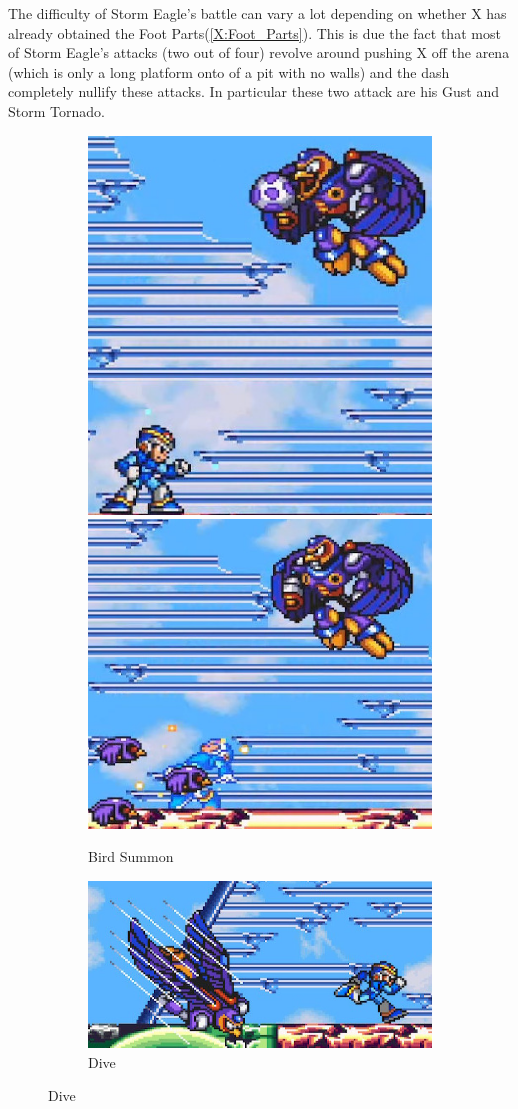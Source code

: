  The difficulty of Storm Eagle's battle can vary a lot depending on whether X has already obtained the Foot Parts(\ref{X:Foot_Parts}). This is due the fact that most of Storm Eagle's attacks (two out of four) revolve around pushing X off the arena (which is only a long platform onto of a pit with no walls) and the dash completely nullify these attacks. In particular these two attack are his Gust\cite{wiki:Storm_Eagle} and Storm Tornado.
 \begin{figure}[htp]
 	\centering
 	\begin{subfigure}{\linewidth}
 		\centering
 		\includegraphics[width=0.25\linewidth]{figures/X1/Storm_eagle/Eagle_egg_1.jpg}
 		\includegraphics[width=0.3\linewidth]{figures/X1/Storm_eagle/Eagle_egg_2.jpg}
 		\caption{Bird Summon}
 	\end{subfigure}
	\begin{subfigure}{0.35\linewidth}
	 	\centering
	 	\includegraphics[width=\linewidth]{figures/X1/Storm_eagle/Eagle_dive.jpg}
	 	\caption{Dive}

\end{subfigure}
\end{figure}
